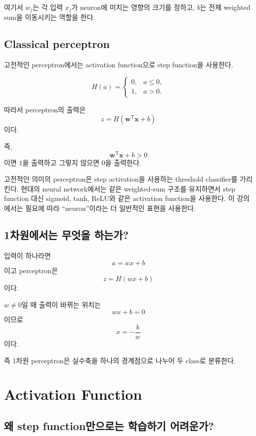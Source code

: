 \documentclass[11pt,a4paper]{article}
\newcommand{\vect}[1]{\bm{#1}}
\newcommand{\T}{^{\mathsf T}}
\begin{document}
여기서 $w_j$는 각 입력 $x_j$가 neuron에 미치는 영향의 크기를 정하고,
$b$는 전체 weighted sum을 이동시키는 역할을 한다.

\subsection{Classical perceptron}

고전적인 perceptron에서는 activation function으로 step function을 사용한다.

\[
H(a)
=
\begin{cases}
0, & a\le 0,\\
1, & a>0.
\end{cases}
\]

따라서 perceptron의 출력은
\[
\boxed{
z
=
H\!\left(\vect{w}\T\vect{x}+b\right)
}
\]
이다.

즉,
\[
\vect{w}\T\vect{x}+b>0
\]
이면 $1$을 출력하고 그렇지 않으면 $0$을 출력한다.

\begin{remarkbox}
고전적인 의미의 perceptron은 step activation을 사용하는 threshold classifier를 가리킨다.
현대의 neural network에서는 같은 weighted-sum 구조를 유지하면서
step function 대신 sigmoid, tanh, ReLU와 같은 activation function을 사용한다.
이 강의에서는 필요에 따라 ``neuron''이라는 더 일반적인 표현을 사용한다.
\end{remarkbox}

\subsection{1차원에서는 무엇을 하는가?}

입력이 하나라면
\[
a=wx+b
\]
이고 perceptron은
\[
z=H(wx+b)
\]
이다.

$w\neq0$일 때 출력이 바뀌는 위치는
\[
wx+b=0
\]
이므로
\[
\boxed{
x=-\frac{b}{w}
}
\]
이다.

즉 1차원 perceptron은 실수축을 하나의 경계점으로 나누어 두 class로 분류한다.

\section{Activation Function}

\subsection{왜 step function만으로는 학습하기 어려운가?}
\end{document}
